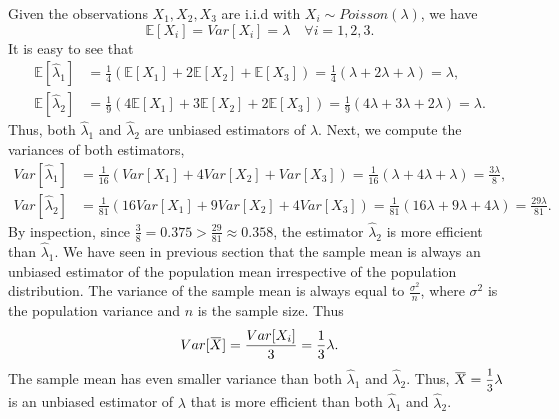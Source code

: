 \begin{solution}
    Given the observations $X_1, X_2, X_3$ are i.i.d with $X_i \sim Poisson(\lambda)$, we have
    \[
        \mathbb{E}[X_i] = Var[X_i] = \lambda \quad \forall i = 1,2,3.
    \]
    It is easy to see that 
    \begin{align*}
        \mathbb{E}[\hat{\lambda}_1] &= \frac{1}{4}(\mathbb{E}[X_1] + 2\mathbb{E}[X_2] + \mathbb{E}[X_3]) = \frac{1}{4}(\lambda + 2\lambda + \lambda) = \lambda,\\
        \mathbb{E}[\hat{\lambda}_2] &= \frac{1}{9}(4\mathbb{E}[X_1] + 3\mathbb{E}[X_2] + 2\mathbb{E}[X_3]) = \frac{1}{9}(4\lambda + 3\lambda + 2\lambda) = \lambda.
    \end{align*}
    Thus, both $\hat{\lambda}_1$ and $\hat{\lambda}_2$ are unbiased estimators of $\lambda$.
    Next, we compute the variances of both estimators,
    \begin{align*}
        Var[\hat{\lambda}_1] &= \frac{1}{16}(Var[X_1] + 4Var[X_2] + Var[X_3]) = \frac{1}{16}(\lambda + 4\lambda + \lambda) = \frac{3\lambda}{8},\\
        Var[\hat{\lambda}_2] &= \frac{1}{81}(16Var[X_1] + 9Var[X_2] + 4Var[X_3]) = \frac{1}{81}(16\lambda + 9\lambda + 4\lambda) = \frac{29\lambda}{81}.
    \end{align*}
    By inspection, since $\frac{3}{8} = 0.375 > \frac{29}{81} \approx 0.358$, the estimator $\hat{\lambda}_2$ is more efficient than $\hat{\lambda}_1$.
    We have seen in previous section that the sample mean is always an unbiased estimator of the population mean irrespective of the population distribution. 
    The variance of the sample mean is always equal to $\frac{\sigma^2}{n}$, where $\sigma^2$ is the population variance and $n$ is the sample size. Thus 
    \[
        Var[\ols{X}] = \frac{Var[X_i]}{3} = \frac{1}{3}\lambda.
    \]
    The sample mean has even smaller variance than both $\hat{\lambda}_1$ and $\hat{\lambda}_2$. Thus, $\ols{X} = \mfrac{1}{3}\lambda$ is an unbiased estimator of $\lambda$ that is more efficient than both $\hat{\lambda}_1$ and $\hat{\lambda}_2$.
\end{solution}

